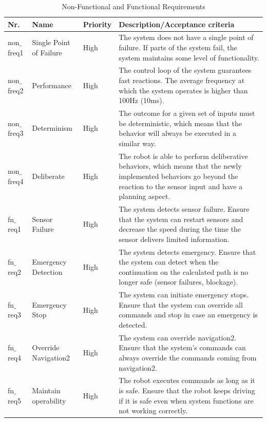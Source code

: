\documentclass[letterpaper, 10pt, conference]{ieeeconf}
\begin{document}
\begin{table}[ht]
	\centering
	\caption{Non-Functional and Functional Requirements}
	\label{tab:fn_req}
	\renewcommand{\arraystretch}{1.25}
		\begin{tabular}{|m{}|m{}|m{}|m{}|} 
			\hline
			\textbf{Nr.} & \textbf{Name} & \textbf{Priority} & \textbf{Description/Acceptance criteria} \\ 
			\hline
			non$\_$freq1 & Single Point of Failure & High & The system does not have a single point of failure. If parts of the system fail, the system maintains some level of functionality. \\ 
			\hline
			non$\_$freq2 & Performance & High & The control loop of the system guarantees fast reactions. The average frequency at which the system operates is higher than 100Hz (10ms). \\ 
			\hline
			non$\_$freq3 & Determinism & High & The outcome for a given set of inputs must be deterministic, which means that the behavior will always be executed in a similar way. \\
			\hline
			non$\_$freq4 & Deliberate & High & The robot is able to perform deliberative behaviors, which means that the newly implemented behaviors go beyond the reaction to the sensor input and have a planning aspect. \\
			\hline
			fn$\_$req1 & Sensor Failure & High & The system detects sensor failure. Ensure that the system can restart sensors and decrease the speed during the time the sensor delivers limited information. \\ 
			\hline
			fn$\_$req2 & Emergency Detection & High & The system detects emergency. Ensure that the system can detect when the continuation on the calculated path is no longer safe (sensor failures, blockage). \\
			\hline
			fn$\_$req3 & Emergency Stop & High & The system can initiate emergency stops. Ensure that the system can override all commands and stop in case an emergency is detected. \\
			\hline 	
			fn$\_$req4 & Override Navigation2 & High & The system can override navigation2. Ensure that the system's commands can always override the commands coming from navigation2. \\
			\hline
			fn$\_$req5 & Maintain operability & High & The robot executes commands as long as it is safe. Ensure that the robot keeps driving if it is safe even when system functions are not working correctly. \\

\end{tabular}
\end{table}
\end{document}
